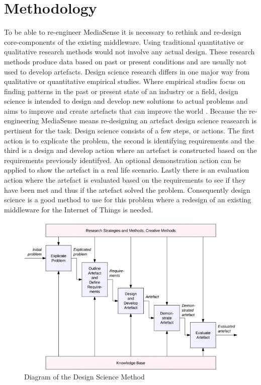 \chapter{Methodology}
To be able to re-engineer MediaSense it is necessary to rethink and re-design core-components of the existing middleware. Using traditional quantitative or qualitative research methods would not involve any actual design. These research methods produce data based on past or present conditions and are usually not used to develop artefacts.
Design science research differs in one major way from qualitative or quantitative empirical studies. Where empirical studies focus on finding patterns in the past or present state of an industry or a field, design science is intended to design and develop new solutions to actual problems \cite{bider2012design} and aims to improve and create artefacts that can improve the world \cite{johannesson2012design}. Because the re-engineering MediaSense means re-designing an artefact design science reasearch is pertinent for the task.
Design science consists of a few steps, or actions. The first action is to explicate the problem, the second is identifying requirements and the third is a design and develop action where an artefact is constructed based on the requirements previously identifyed. An optional demonstration action can be applied to show the artefact in a real life scenario. Lastly there is an evaluation action where the artefact is evaluated based on the requirements to see if they have been met and thus if the artefact solved the problem. Consequently design science is a good method to use for this problem where a redesign of an existing middleware for the Internet of Things is needed.

\begin{figure}[h!]
	\centering
    	\includegraphics[scale=0.50]{part_3/design_science.png}
		\caption{Diagram of the Design Science Method \cite{johannesson2012design}} 
		\label{ds}
\end{figure}

